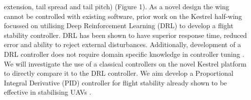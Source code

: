     extension, tail spread and tail pitch) \cite{5}
    (Figure 1).
    As a novel design
    the wing cannot be controlled with existing software, prior work on the
    Kestrel half-wing focussed on utilising Deep Reinforcement Learning
    (DRL) to develop a flight stability controller. DRL has been shown
    to have superior response time, reduced error and ability to reject
    external disturbances. Additionally, development of a DRL controller
    does not require domain specific knowledge in controller tuning \cite{6}.
    \vspace{\baselineskip}
    We will investigate the use of a classical controllers on the novel
    Kestrel platform to directly compare it to the DRL controller.
    We aim develop a Proportional Integral Derivative (PID) controller
    for flight stability already shown to be effective in stabilising UAVs
    \cite{7}.
    \vspace{\baselineskip}

